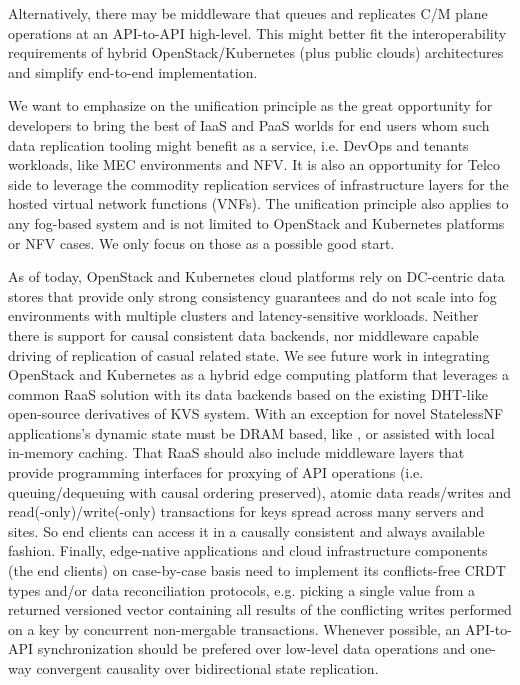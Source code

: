 \documentclass[conference]{IEEEtran}
\begin{document}
Alternatively, there may be middleware that queues and replicates C/M plane
operations at an API-to-API high-level. This might better fit the
interoperability requirements of hybrid OpenStack/Kubernetes (plus public
clouds) architectures and simplify end-to-end implementation.

We want to emphasize on the unification principle as the great opportunity for
developers to bring the best of IaaS and PaaS worlds for end users whom such
data replication tooling might benefit as a service, i.e. DevOps and tenants
workloads, like MEC environments and NFV. It is also an opportunity for Telco
side to leverage the commodity replication services of infrastructure layers
for the hosted virtual network functions (VNFs). The unification principle also
applies to any fog-based system and is not limited to OpenStack and Kubernetes
platforms or NFV cases. We only focus on those as a possible good start.

As of today, OpenStack and Kubernetes cloud platforms rely on DC-centric data
stores that provide only strong consistency guarantees and do not scale into
fog environments with multiple clusters and latency-sensitive workloads.
Neither there is support for causal consistent data backends, nor middleware
capable driving of replication of casual related state. We see future work in
integrating OpenStack and Kubernetes as a hybrid edge computing platform that
leverages a common RaaS solution with its data backends based on the existing
DHT-like open-source derivatives of\cite{b17} KVS system. With an exception for
novel StatelessNF applications's dynamic state must be DRAM based, like
\cite{b18}, or assisted with local in-memory caching. That RaaS should also
include middleware layers that provide programming interfaces for proxying of
API operations (i.e. queuing/dequeuing with causal ordering preserved),
atomic data reads/writes and read(-only)/write(-only) transactions for keys
spread across many servers and sites. So end clients can access it in a
causally consistent and always available fashion. Finally, edge-native
applications and cloud infrastructure components (the end clients) on
case-by-case basis need to implement its conflicts-free CRDT types and/or data
reconciliation protocols, e.g. picking a single value from a returned versioned
vector containing all results of the conflicting writes performed on a key by
concurrent non-mergable transactions. Whenever possible, an API-to-API
synchronization should be prefered over low-level data operations and one-way
convergent causality over bidirectional state replication.
\end{document}
